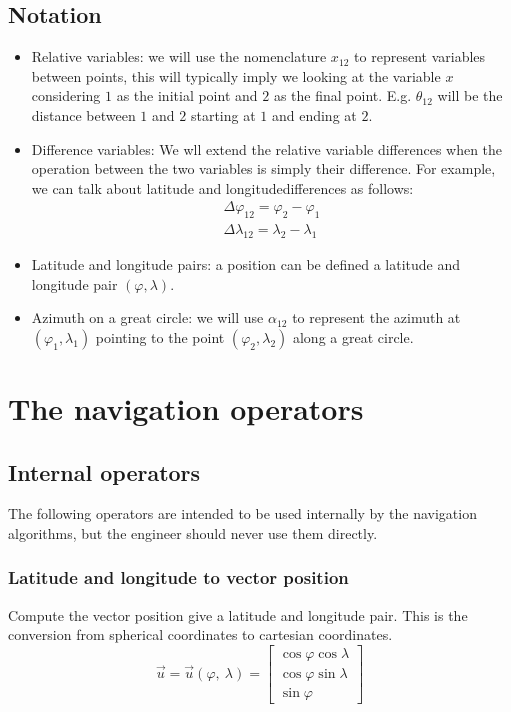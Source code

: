 \subsection{Notation}
\begin{itemize}
	\item Relative variables: we will use the nomenclature $x_{12}$ to represent variables between points, this will typically imply we looking at the variable $x$ considering $1$ as the initial point and $2$ as the final point. E.g. $\theta_{12}$ will be the distance between $1$ and $2$ starting at $1$ and ending at $2$.
    \item Difference variables: We wll extend the relative variable differences when the operation between the two variables is simply their difference. For example, we can talk about latitude and longitudedifferences as follows:
        \begin{align}
            \Delta \varphi_{12} = \varphi_2 - \varphi_1 \\
            \Delta \lambda_{12} = \lambda_2 - \lambda_1
        \end{align}
    \item Latitude and longitude pairs: a position can be defined a latitude and longitude pair $(\varphi, \lambda)$.
    \item Azimuth on a great circle: we will use $\alpha_{12}$ to represent the azimuth at $(\varphi_1, \lambda_1)$ pointing to the point $(\varphi_2, \lambda_2)$ along a great circle.
\end{itemize}

\section{The navigation operators}

\subsection{Internal operators}
The following operators are intended to be used internally by the navigation algorithms, but the engineer should never use them directly.

\subsubsection{Latitude and longitude to vector position}
Compute the vector position give a latitude and longitude pair. This is the conversion from spherical coordinates to cartesian coordinates.
\begin{equation}
    \vec{u} = \vec{u} (\varphi, \ \lambda) =
    \left[
        \begin{matrix}
            \cos \varphi \cos \lambda \\
            \cos \varphi \sin \lambda \\
            \sin \varphi
    \end{matrix}\right]
\end{equation}

